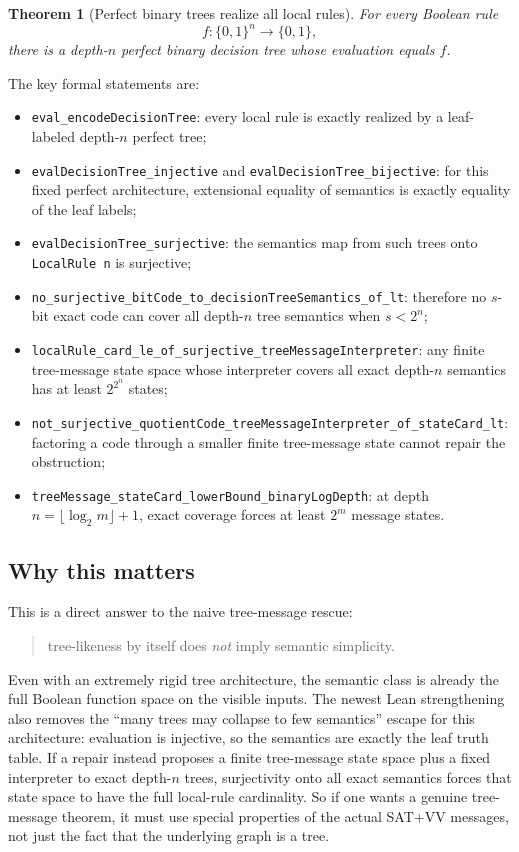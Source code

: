 \documentclass[11pt]{article}
\newtheorem{theorem}{Theorem}[section]
\theoremstyle{remark}
\begin{document}
\begin{theorem}[Perfect binary trees realize all local rules]
For every Boolean rule
\[
  f : \{0,1\}^n \to \{0,1\},
\]
there is a depth-\(n\) perfect binary decision tree whose evaluation equals \(f\).
\end{theorem}

\noindent
The key formal statements are:
\begin{itemize}[leftmargin=1.5em]
  \item \texttt{eval\_encodeDecisionTree}: every local rule is exactly realized by a leaf-labeled
  depth-\(n\) perfect tree;
  \item \texttt{evalDecisionTree\_injective} and \texttt{evalDecisionTree\_bijective}: for this fixed
  perfect architecture, extensional equality of semantics is exactly equality of the leaf labels;
  \item \texttt{evalDecisionTree\_surjective}: the semantics map from such trees onto
  \texttt{LocalRule n} is surjective;
  \item \texttt{no\_surjective\_bitCode\_to\_decisionTreeSemantics\_of\_lt}: therefore no
  \(s\)-bit exact code can cover all depth-\(n\) tree semantics when \(s < 2^n\);
  \item \texttt{localRule\_card\_le\_of\_surjective\_treeMessageInterpreter}: any finite
  tree-message state space whose interpreter covers all exact depth-\(n\) semantics has at least
  \(2^{2^n}\) states;
  \item \texttt{not\_surjective\_quotientCode\_treeMessageInterpreter\_of\_stateCard\_lt}: factoring
  a code through a smaller finite tree-message state cannot repair the obstruction;
  \item \texttt{treeMessage\_stateCard\_lowerBound\_binaryLogDepth}: at depth
  \(n=\lfloor\log_2 m\rfloor+1\), exact coverage forces at least \(2^m\) message states.
\end{itemize}

\subsection{Why this matters}

This is a direct answer to the naive tree-message rescue:

\begin{quote}
tree-likeness by itself does \emph{not} imply semantic simplicity.
\end{quote}

Even with an extremely rigid tree architecture, the semantic class is already the full Boolean
function space on the visible inputs.  The newest Lean strengthening also removes the ``many trees
may collapse to few semantics'' escape for this architecture: evaluation is injective, so the
semantics are exactly the leaf truth table.  If a repair instead proposes a finite tree-message
state space plus a fixed interpreter to exact depth-\(n\) trees, surjectivity onto all exact
semantics forces that state space to have the full local-rule cardinality.  So if one wants a
genuine tree-message theorem, it must use special properties of the actual SAT+VV messages, not
just the fact that the underlying graph is a tree.
\end{document}
